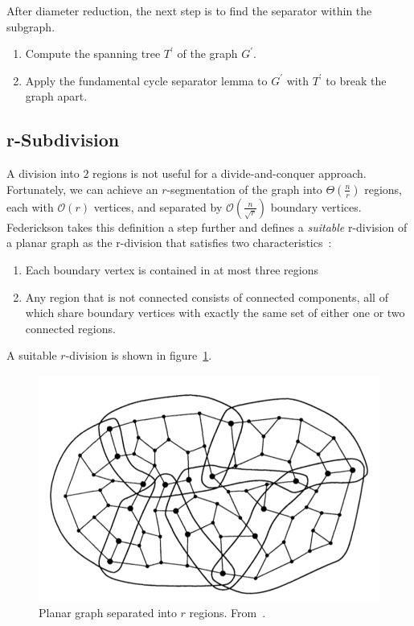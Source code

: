 \documentclass[11pt]{article}
\begin{document}
    After diameter reduction, the next step is to find the separator within the subgraph.
    \begin{enumerate}
      \item Compute the spanning tree $T^{'}$ of the graph $G^{'}$.

      \item Apply the fundamental cycle separator lemma to $G^{'}$ with $T^{'}$ to break the graph apart.
    \end{enumerate}

    \subsection{r-Subdivision}
    \label{sec:graph-sep-rsub}

    A division into $2$ regions is not useful for a divide-and-conquer approach. Fortunately, we can achieve an $r$-segmentation of the graph into $\Theta \left (\frac{n}{r} \right )$ regions, each with $\mathcal{O}(r)$ vertices, and separated by $\mathcal{O} \left (\frac{n}{\sqrt{r}} \right )$ boundary vertices. Federickson takes this definition a step further and defines a \textit{suitable} r-division of a planar graph as the r-division that satisfies two characteristics~\cite{federickson1987fast}:
    \begin{enumerate}
        \item Each boundary vertex is contained in at most three regions

        \item Any region that is not connected consists of connected components, all of which share boundary vertices with exactly the same set of either one or two connected regions.
    \end{enumerate}
A suitable $r$-division is shown in figure~\ref{fig:rsep}.

    \begin{figure}[!htb]
      \centering
      \includegraphics[width=.5\textwidth]{rsep}
      \caption{Planar graph separated into $r$ regions. From~\cite{federickson1987fast}.}
      \label{fig:rsep}
    \end{figure}
\end{document}
